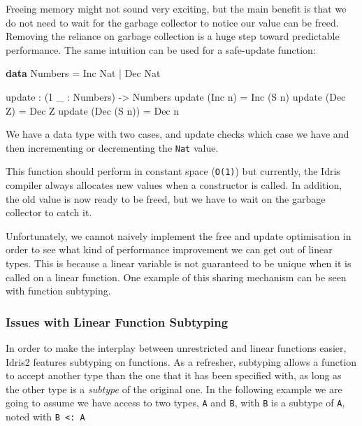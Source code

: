 \documentclass[
]{article}
\newenvironment{Shaded}{}{}
\newcommand{\DataTypeTok}[1]{\textcolor[rgb]{0.56,0.13,0.00}{#1}}
\newcommand{\DecValTok}[1]{\textcolor[rgb]{0.25,0.63,0.44}{#1}}
\newcommand{\KeywordTok}[1]{\textcolor[rgb]{0.00,0.44,0.13}{\textbf{#1}}}
\newcommand{\NormalTok}[1]{#1}
\newcommand{\OperatorTok}[1]{\textcolor[rgb]{0.40,0.40,0.40}{#1}}
\newcommand{\OtherTok}[1]{\textcolor[rgb]{0.00,0.44,0.13}{#1}}
\begin{document}
Freeing memory might not sound very exciting, but the main benefit is
that we do not need to wait for the garbage collector to notice our
value can be freed. Removing the reliance on garbage collection is a
huge step toward predictable performance. The same intuition can be used
for a safe-update function:

\begin{Shaded}
\begin{Highlighting}[]
\KeywordTok{data} \DataTypeTok{Numbers} \OtherTok{=} \DataTypeTok{Inc} \DataTypeTok{Nat} \OperatorTok{|} \DataTypeTok{Dec} \DataTypeTok{Nat}

\NormalTok{update }\OperatorTok{:}\NormalTok{ (}\DecValTok{1}\NormalTok{ \_ }\OperatorTok{:} \DataTypeTok{Numbers}\NormalTok{) }\OtherTok{{-}\textgreater{}} \DataTypeTok{Numbers}
\NormalTok{update (}\DataTypeTok{Inc}\NormalTok{ n) }\OtherTok{=} \DataTypeTok{Inc}\NormalTok{ (}\DataTypeTok{S}\NormalTok{ n)}
\NormalTok{update (}\DataTypeTok{Dec} \DataTypeTok{Z}\NormalTok{) }\OtherTok{=} \DataTypeTok{Dec} \DataTypeTok{Z}
\NormalTok{update (}\DataTypeTok{Dec}\NormalTok{ (}\DataTypeTok{S}\NormalTok{ n)) }\OtherTok{=} \DataTypeTok{Dec}\NormalTok{ n}
\end{Highlighting}
\end{Shaded}

We have a data type with two cases, and update checks which case we have
and then incrementing or decrementing the \texttt{Nat} value.

This function should perform in constant space (\texttt{O(1)}) but
currently, the Idris compiler always allocates new values when a
constructor is called. In addition, the old value is now ready to be
freed, but we have to wait on the garbage collector to catch it.

Unfortunately, we cannot naively implement the free and update
optimisation in order to see what kind of performance improvement we can
get out of linear types. This is because a linear variable is not
guaranteed to be unique when it is called on a linear function. One
example of this sharing mechanism can be seen with function subtyping.

\hypertarget{issues-with-linear-function-subtyping}{%
\subsubsection{Issues with Linear Function
Subtyping}\label{issues-with-linear-function-subtyping}}

In order to make the interplay between unrestricted and linear functions
easier, Idris2 features subtyping on functions. As a refresher,
subtyping allows a function to accept another type than the one that it
has been specified with, as long as the other type is a \emph{subtype}
of the original one. In the following example we are going to assume we
have access to two types, \texttt{A} and \texttt{B}, with \texttt{B} is
a subtype of \texttt{A}, noted with \texttt{B\ \textless{}:\ A}
\end{document}
